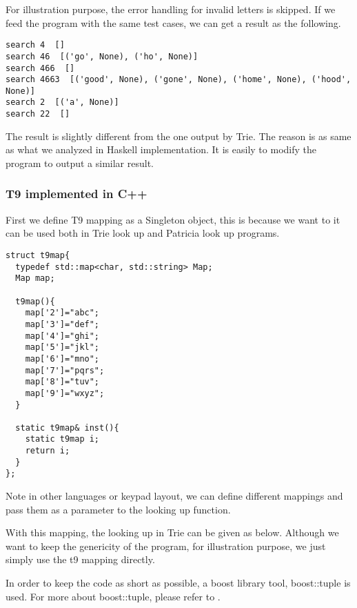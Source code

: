 \documentclass{article}
\begin{document}
For illustration purpose, the error handling for invalid letters is skipped.
If we feed the program with the same test cases, we can get a result as the 
following.

\begin{verbatim}
search 4  []
search 46  [('go', None), ('ho', None)]
search 466  []
search 4663  [('good', None), ('gone', None), ('home', None), ('hood', None)]
search 2  [('a', None)]
search 22  []
\end{verbatim}

The result is slightly different from the one output by Trie. The reason is
as same as what we analyzed in Haskell implementation. It is easily to modify
the program to output a similar result.

\subsubsection*{T9 implemented in C++}

First we define T9 mapping as a Singleton object, this is because we
want to it can be used both in Trie look up and Patricia look up programs.

\lstset{language=C++}
\begin{lstlisting}
struct t9map{
  typedef std::map<char, std::string> Map;
  Map map;

  t9map(){
    map['2']="abc";
    map['3']="def";
    map['4']="ghi";
    map['5']="jkl";
    map['6']="mno";
    map['7']="pqrs";
    map['8']="tuv";
    map['9']="wxyz";
  }

  static t9map& inst(){
    static t9map i;
    return i;
  }
};
\end{lstlisting}

Note in other languages or keypad layout, we can define different
mappings and pass them as a parameter to the looking up function.

With this mapping, the looking up in Trie can be given as
below. Although we want to keep the genericity of the program, for
illustration purpose, we just simply use the t9 mapping directly.

In order to keep the code as short as possible, a boost library tool,
boost::tuple is used. For more about boost::tuple, please refer to \cite{boost-book}.
\end{document}
